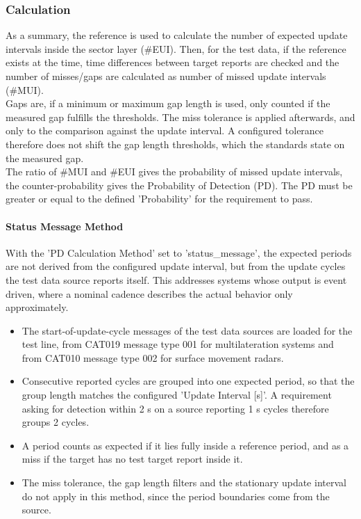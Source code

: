 \subsubsection{Calculation}

As a summary, the reference is used to calculate the number of expected update intervals inside the sector layer (\#EUI). Then, for the test data, if the reference exists at the time, time differences between target reports are checked and the number of misses/gaps are calculated as number of missed update intervals (\#MUI). \\

Gaps are, if a minimum or maximum gap length is used, only counted if the measured gap fulfills the thresholds. The miss tolerance is applied afterwards, and only to the comparison against the update interval. A configured tolerance therefore does not shift the gap length thresholds, which the standards state on the measured gap. \\

The ratio of \#MUI and \#EUI gives the probability of missed update intervals, the counter-probability gives the Probability of Detection (PD). The PD must be greater or equal to the defined 'Probability' for the requirement to pass. \\

\paragraph{Status Message Method}

With the 'PD Calculation Method' set to 'status\_message', the expected periods are not derived from the configured update interval, but from the update cycles the test data source reports itself. This addresses systems whose output is event driven, where a nominal cadence describes the actual behavior only approximately.

\begin{itemize}
\item The start-of-update-cycle messages of the test data sources are loaded for the test line, from CAT019 message type 001 for multilateration systems and from CAT010 message type 002 for surface movement radars.
\item Consecutive reported cycles are grouped into one expected period, so that the group length matches the configured 'Update Interval [s]'. A requirement asking for detection within 2 s on a source reporting 1 s cycles therefore groups 2 cycles.
\item A period counts as expected if it lies fully inside a reference period, and as a miss if the target has no test target report inside it.
\item The miss tolerance, the gap length filters and the stationary update interval do not apply in this method, since the period boundaries come from the source.
\end{itemize}
\ \\

